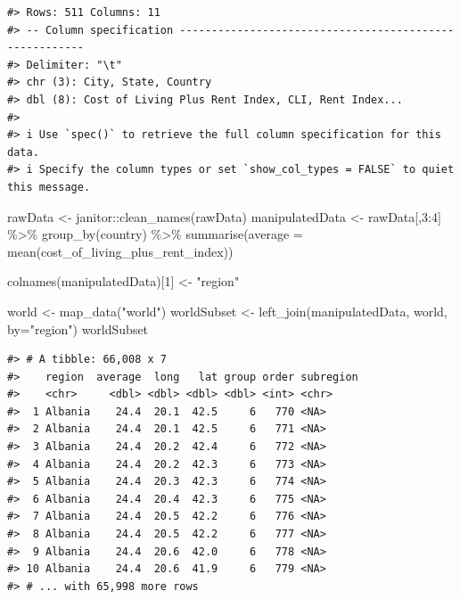 \documentclass[
  11pt,
  a4paper,
  twoside]{scrbook}
\newenvironment{Shaded}{\begin{snugshade}}{\end{snugshade}}
\newcommand{\AttributeTok}[1]{\textcolor[rgb]{0.77,0.63,0.00}{#1}}
\newcommand{\DecValTok}[1]{\textcolor[rgb]{0.00,0.00,0.81}{#1}}
\newcommand{\FunctionTok}[1]{\textcolor[rgb]{0.00,0.00,0.00}{#1}}
\newcommand{\NormalTok}[1]{#1}
\newcommand{\OtherTok}[1]{\textcolor[rgb]{0.56,0.35,0.01}{#1}}
\newcommand{\SpecialCharTok}[1]{\textcolor[rgb]{0.00,0.00,0.00}{#1}}
\newcommand{\StringTok}[1]{\textcolor[rgb]{0.31,0.60,0.02}{#1}}
\begin{document}
\linespread{1}

\begin{verbatim}
#> Rows: 511 Columns: 11
#> -- Column specification -------------------------------------------------------
#> Delimiter: "\t"
#> chr (3): City, State, Country
#> dbl (8): Cost of Living Plus Rent Index, CLI, Rent Index...
#> 
#> i Use `spec()` to retrieve the full column specification for this data.
#> i Specify the column types or set `show_col_types = FALSE` to quiet this message.
\end{verbatim}

\linespread{1}

\begin{Shaded}
\begin{Highlighting}[]
\NormalTok{rawData }\OtherTok{\textless{}{-}}\NormalTok{ janitor}\SpecialCharTok{::}\FunctionTok{clean\_names}\NormalTok{(rawData)}
\NormalTok{manipulatedData }\OtherTok{\textless{}{-}}\NormalTok{ rawData[,}\DecValTok{3}\SpecialCharTok{:}\DecValTok{4}\NormalTok{] }\SpecialCharTok{\%\textgreater{}\%} \FunctionTok{group\_by}\NormalTok{(country) }\SpecialCharTok{\%\textgreater{}\%} \FunctionTok{summarise}\NormalTok{(}\AttributeTok{average =} \FunctionTok{mean}\NormalTok{(cost\_of\_living\_plus\_rent\_index))}

\FunctionTok{colnames}\NormalTok{(manipulatedData)[}\DecValTok{1}\NormalTok{] }\OtherTok{\textless{}{-}} \StringTok{"region"}

\NormalTok{world }\OtherTok{\textless{}{-}} \FunctionTok{map\_data}\NormalTok{(}\StringTok{"world"}\NormalTok{)}
\NormalTok{worldSubset }\OtherTok{\textless{}{-}} \FunctionTok{left\_join}\NormalTok{(manipulatedData, world, }\AttributeTok{by=}\StringTok{"region"}\NormalTok{)}
\NormalTok{worldSubset}
\end{Highlighting}
\end{Shaded}

\linespread{1}

\begin{verbatim}
#> # A tibble: 66,008 x 7
#>    region  average  long   lat group order subregion
#>    <chr>     <dbl> <dbl> <dbl> <dbl> <int> <chr>    
#>  1 Albania    24.4  20.1  42.5     6   770 <NA>     
#>  2 Albania    24.4  20.1  42.5     6   771 <NA>     
#>  3 Albania    24.4  20.2  42.4     6   772 <NA>     
#>  4 Albania    24.4  20.2  42.3     6   773 <NA>     
#>  5 Albania    24.4  20.3  42.3     6   774 <NA>     
#>  6 Albania    24.4  20.4  42.3     6   775 <NA>     
#>  7 Albania    24.4  20.5  42.2     6   776 <NA>     
#>  8 Albania    24.4  20.5  42.2     6   777 <NA>     
#>  9 Albania    24.4  20.6  42.0     6   778 <NA>     
#> 10 Albania    24.4  20.6  41.9     6   779 <NA>     
#> # ... with 65,998 more rows
\end{verbatim}
\end{document}
